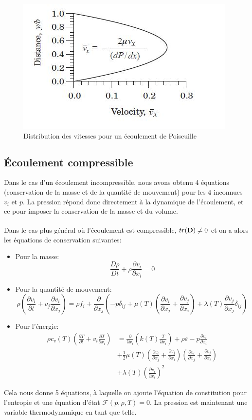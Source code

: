 \begin{figure}[!h]
\centering
\includegraphics[scale=0.6]{./poiseuille.jpg}
\caption{Distribution des vitesses pour un écoulement de Poiseuille}
\label{fig:poiseuille}
\end{figure}

\subsection{\'Ecoulement compressible}
Dans le cas d'un écoulement incompressible, nous avons obtenu 4 équations (conservation de la masse et de la quantité de mouvement) pour les 4 inconnues $v_i$ et $p$. La pression répond donc directement à la dynamique de l'écoulement, et ce pour imposer la conservation de la masse et du volume.
\paragraph{}
Dans le cas plus général où l'écoulement est compressible, $tr(\textbf{D})\neq 0$ et on a alors les équations de conservation suivantes:
\begin{itemize}
\item Pour la masse:
	$$\frac{D\rho}{Dt}+\rho\frac{\partial v_i}{\partial x_i}=0$$
\item Pour la quantité de mouvement:
 $$\rho\left(\frac{\partial v_i}{\partial t}+v_j\frac{\partial v_i}{\partial x_j}\right)=\rho f_i+\frac{\partial}{\partial x_j}\left(-p\delta_{ij}+\mu(T)\left(\frac{\partial v_i}{\partial x_j}+\frac{\partial v_j}{\partial x_i}\right)+\lambda(T)\frac{\partial v_j}{\partial x_j}\delta_{ij}\right)$$
\item Pour l'énergie:
\begin{align*}
\rho c_v(T)\left(\frac{\partial T}{\partial t}+v_i\frac{\partial T}{\partial x_i}\right)&=\frac{\partial}{\partial x_i}\left(k(T)\frac{T}{\partial x_i}\right)+\rho\varepsilon-p\frac{\partial v_i}{\partial x_i}\\
 &+\frac{1}{2}\mu(T)\left(\frac{\partial v_i}{\partial x_j}+\frac{\partial v_j}{\partial x_i}\right)\left(\frac{\partial v_i}{\partial x_j}+\frac{\partial v_j}{\partial x_i}\right)\\
 &+\lambda(T)\left(\frac{\partial v_i}{\partial x_i}\right)^2
\end{align*}
\end{itemize}
Cela nous donne 5 équations, à laquelle on ajoute l'équation de constitution pour l'entropie et une équation d'état $\mathcal{F}(p,\rho,T)=0$. La pression est maintenant une variable thermodynamique en tant que telle.

